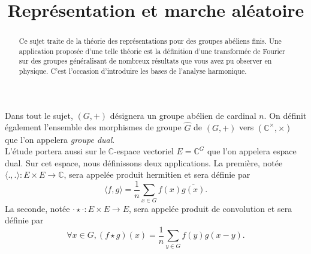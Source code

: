 \documentclass{article}[a4paper]
\title{Représentation et marche aléatoire}
\newcommand{\C}{\mathbb{C}}
\newcommand{\braket}[2]{\langle #1,#2\rangle}
\begin{document}
\begin{abstract}
    Ce sujet traite de la théorie des représentations pour des groupes abéliens finis. 
    Une application proposée d'une telle théorie est la définition d'une transformée 
    de Fourier sur des groupes généralisant de nombreux résultats que vous avez pu 
    observer en physique. C'est l'occasion d'introduire les bases de l'analyse harmonique.
\end{abstract}
Dans tout le sujet, \((G,+)\) désignera un groupe abélien de cardinal \(n\). 
On définit également l'ensemble des morphismes de groupe \(\widehat{G}\) de \((G,+)\) 
vers \((\mathbb{C}^\times,\times)\) que l'on appelera \textit{groupe dual}.
\\
L'étude portera aussi sur le \(\C\)-espace vectoriel \(E = \C^G\) que l'on appelera 
espace dual. Sur cet espace, nous définissons deux applications. 
La première, notée \(\braket{.}{.} : E\times E \to \C\), sera appelée produit hermitien 
et sera définie par 
\begin{equation*}
    \braket{f}{g} = \frac{1}{n}\sum_{x\in G} f(x)\overline{g(x)}.
\end{equation*}
La seconde, notée \(\cdot\star \cdot : E\times E \to E\), sera appelée produit de 
convolution et sera définie par 
\begin{equation*}
    \forall x\in G, (f\star g)(x) = \frac{1}{n}\sum_{y\in G} f(y)g(x-y).
\end{equation*}
\end{document}
